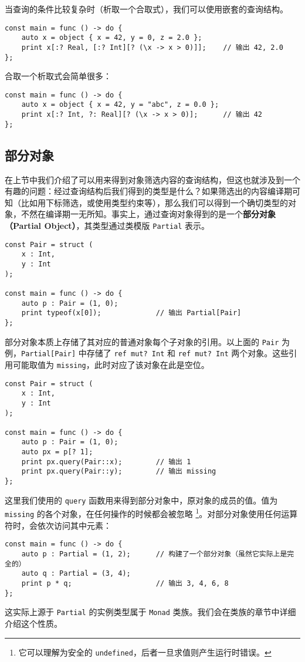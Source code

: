 当查询的条件比较复杂时（析取一个合取式），我们可以使用嵌套的查询结构。

\begin{lstlisting}
const main = func () -> do {
	auto x = object { x = 42, y = 0, z = 2.0 };
	print x[:? Real, [:? Int][? (\x -> x > 0)]];	// 输出 42, 2.0
};
\end{lstlisting}

合取一个析取式会简单很多：

\begin{lstlisting}
const main = func () -> do {
	auto x = object { x = 42, y = "abc", z = 0.0 };
	print x[:? Int, ?: Real][? (\x -> x > 0)];		// 输出 42
};
\end{lstlisting}


\subsection{部分对象}

在上节中我们介绍了可以用来得到对象筛选内容的查询结构，但这也就涉及到一个有趣的问题：经过查询结构后我们得到的类型是什么？如果筛选出的内容编译期可知（比如用下标筛选，或使用类型约束等），那么我们可以得到一个确切类型的对象，不然在编译期一无所知。事实上，通过查询对象得到的是一个\textbf{部分对象（Partial Object）}，其类型通过类模版 \lstinline!Partial! 表示。

\begin{lstlisting}
const Pair = struct (
	x : Int,
	y : Int
);

const main = func () -> do {
	auto p : Pair = (1, 0);
	print typeof(x[0]);				// 输出 Partial[Pair]
};
\end{lstlisting}

部分对象本质上存储了其对应的普通对象每个子对象的引用。以上面的 \lstinline!Pair! 为例，\lstinline!Partial[Pair]! 中存储了 \lstinline!ref mut? Int! 和 \lstinline!ref mut? Int! 两个对象。这些引用可能取值为 \lstinline!missing!，此时对应了该对象在此是空位。

\begin{lstlisting}
const Pair = struct (
	x : Int,
	y : Int
);

const main = func () -> do {
	auto p : Pair = (1, 0);
	auto px = p[? 1];
	print px.query(Pair::x);		// 输出 1
	print px.query(Pair::y);		// 输出 missing
};
\end{lstlisting}

这里我们使用的 \lstinline!query! 函数用来得到部分对象中，原对象的成员的值。值为 \lstinline!missing! 的各个对象，在任何操作的时候都会被忽略 \footnote{它可以理解为安全的 \lstinline!undefined!，后者一旦求值则产生运行时错误。}。对部分对象使用任何运算符时，会依次访问其中元素：

\begin{lstlisting}
const main = func () -> do {
	auto p : Partial = (1, 2);		// 构建了一个部分对象（虽然它实际上是完全的）
	auto q : Partial = (3, 4);
	print p * q;					// 输出 3, 4, 6, 8
};
\end{lstlisting}

这实际上源于 \lstinline!Partial! 的实例类型属于 \lstinline!Monad! 类族。我们会在类族的章节中详细介绍这个性质。


